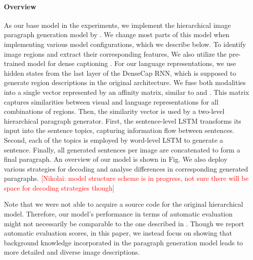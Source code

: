 \documentclass[11pt,a4paper]{article}
\newcommand{\kibitz}[2]{\ifnum\Comments=1\textcolor{#1}{#2}\fi}
\newcommand{\nikolai}[1]{\kibitz{red}      {[Nikolai: #1]}}
\begin{document}
\paragraph{Overview}
As our base model in the experiments, we implement the hierarchical image paragraph generation model by \cite{krause2016hierarchical}.
We change most parts of this model when implementing various model configurations, which we describe below. %
To identify image regions and extract their corresponding features,
We also utilize the pre-trained model for dense captioning \cite{densecap}.
For our language representations, we use hidden states from the last layer of the DenseCap RNN, which is supposed to generate region descriptions in the original architecture.
We fuse both modalities into a single vector represented by an affinity matrix, similar to  and . 
This matrix captures similarities between visual and language representations for all combinations of regions. %
Then, the similarity vector is used by a two-level hierarchical paragraph generator.
First, the sentence-level LSTM transforms its input into the sentence topics, capturing information flow between sentences.
Second, each of the topics is employed by word-level LSTM to generate a sentence.
Finally, all generated sentences per image are concatenated to form a final paragraph. An overview of our model is shown in Fig.
We also deploy various strategies for decoding and analyse differences in corresponding generated paragraphs.
\nikolai{model structure scheme is in progress, not sure there will be space for decoding strategies though}

Note that we were not able to acquire a source code for the original hierarchical model.
Therefore, our model's performance in terms of automatic evaluation might not necessarily be comparable to the one described in .
Though we report automatic evaluation scores, in this paper, we instead focus on showing that background knowledge incorporated in the paragraph generation model leads to more detailed and diverse image descriptions.
\end{document}

